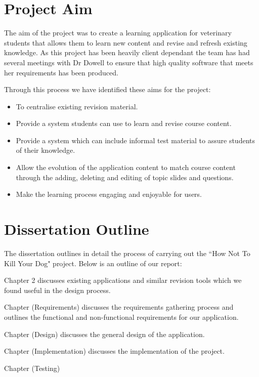 \documentclass{l3proj}
\begin{document}
\section{Project Aim}

The aim of the project was to create a learning application for veterinary students that allows them to learn new content and revise and refresh existing knowledge. As this project has been heavily client dependant the team has had several meetings with Dr Dowell to ensure that high quality software that meets her requirements has been produced.
\newline

Through this process we have identified these aims for the project:
\newline

\begin{itemize}
\item To centralise existing revision material.
\item Provide a system students can use to learn and revise course content.
\item Provide a system which can include informal test material to assure students of their knowledge.
\item Allow the evolution of the application content to match course content through the adding, deleting and editing of topic slides and questions.
\item Make the learning process engaging and enjoyable for users.
\end{itemize}   

\section{Dissertation Outline}

The dissertation outlines in detail the process of carrying out the ``How Not To Kill Your Dog" project. Below is an outline of our report:

Chapter 2 discusses existing applications and similar revision tools which we found useful in the design process.

Chapter (Requirements) discusses the requirements gathering process and outlines the functional and non-functional requirements for our application.

Chapter (Design) discusses the general design of the application.

Chapter (Implementation) discusses the implementation of the project.

Chapter (Testing)
\end{document}
